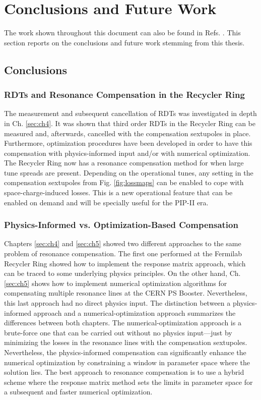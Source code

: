\chapter{Conclusions and Future Work}
\label{sec:ch7}

The work shown throughout this document can also be found in Refs. \cite{cris1,cris2, cris3}. This section reports on the conclusions and future work stemming from this thesis.

\section{Conclusions}

\subsection{RDTs and Resonance Compensation in the Recycler Ring}

The measurement and subsequent cancellation of RDTs was investigated in depth in Ch. \ref{sec:ch4}. It was shown that third order RDTs in the Recycler Ring can be measured and, afterwards, cancelled with the compensation sextupoles in place. Furthermore, optimization procedures have been developed in order to have this compensation with physics-informed input and/or with numerical optimization. The Recycler Ring now has a resonance compensation method for when large tune spreads are present. Depending on the operational tunes, any setting in the compensation sextupoles from Fig. \ref{fig:lossmaps} can be enabled to cope with space-charge-induced losses. This is a new operational feature that can be enabled on demand and will be specially useful for the PIP-II era. 

\subsection{Physics-Informed vs. Optimization-Based Compensation}

Chapters \ref{sec:ch4} and \ref{sec:ch5} showed two different approaches to the same problem of resonance compensation. The first one performed at the Fermilab Recycler Ring showed how to implement the response matrix approach, which can be traced to some underlying physics principles. On the other hand, Ch. \ref{sec:ch5} shows how to implement numerical optimization algorithms for compensating multiple resonance lines at the CERN PS Booster. Nevertheless, this last approach had no direct physics input. The distinction between a physics-informed approach and a numerical-optimization approach summarizes the differences between both chapters. The numerical-optimization approach is a brute-force one that can be carried out without no physics input---just by minimizing the losses in the resonance lines with the compensation sextupoles. Nevertheless, the physics-informed compensation can significantly enhance the numerical optimization by constraining a window in parameter space where the solution lies. The best approach to resonance compensation is to use a hybrid scheme where the response matrix method sets the limits in parameter space for a subsequent and faster numerical optimization. 

